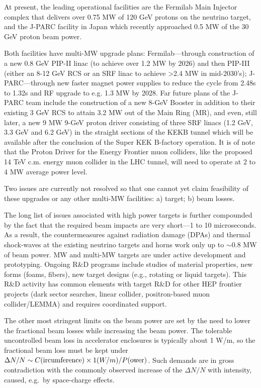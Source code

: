 At present, the leading operational facilities are the Fermilab Main Injector complex that delivers over 0.75 MW of 120 GeV protons on the neutrino target, and the J-PARC facility in Japan which recently approached 0.5 MW of the 30 GeV proton beam power.

Both facilities have multi-MW upgrade plans: Fermilab---through construction of a new 0.8 GeV PIP-II linac (to achieve over 1.2 MW by 2026) and then PIP-III (either an 8-12 GeV RCS or an SRF linac to achieve >2.4 MW in mid-2030's); 
J-PARC---through new faster magnet power supplies to reduce the cycle from 2.48s to 1.32s and RF upgrade to e.g. 1.3 MW by 2028. Far future plans of the J-PARC team include the construction of a new 8-GeV Booster in addition to their existing 3 GeV RCS to attain 3.2 MW out of the Main Ring (MR), and even, still later, a new 9 MW 9-GeV proton driver consisting of three SRF linacs (1.2 GeV, 3.3 GeV and 6.2 GeV) in the straight sections of the KEKB tunnel which will be available after the conclusion of the Super KEK B-factory operation. It is of note that the Proton Driver for the Energy Frontier muon colliders, like the proposed 14 TeV c.m. energy muon collider in the LHC tunnel, will need to operate at 2 to 4 MW average power level. 

Two issues are currently not resolved so that one cannot yet claim feasibility of these upgrades or any other multi-MW facilities: a) target; b) beam losses.

The long list of issues associated with high power targets is further compounded by the fact that the required beam impacts are very short---1 to 10 microseconds. As a result, the countermeasures against radiation damage (DPAs) and thermal shock-waves at the existing neutrino targets and horns work only up to $\sim$0.8 MW of beam power. MW and multi-MW targets are under active development and prototyping. Ongoing R\&D programs include studies of material properties, new forms (foams, fibers), new target designs (e.g., rotating or liquid targets). This R\&D activity has common elements with target R\&D for other HEP frontier projects (dark sector searches, linear collider, positron-based muon collider/LEMMA) and requires coordinated support.

The other most stringent limits on the beam power are set by the need to lower the fractional beam losses while increasing the beam power. The tolerable uncontrolled beam loss in accelerator enclosures is typically about 1 W/m, so the fractional beam loss must be kept under $\Delta N/N\sim C({\rm ircumference})\times 1 (W/m) /P({\rm ower})$. 
Such demands are in gross contradiction with the commonly observed increase of the $\Delta N/N$ with intensity, caused, e.g.\ by space-charge effects. 

